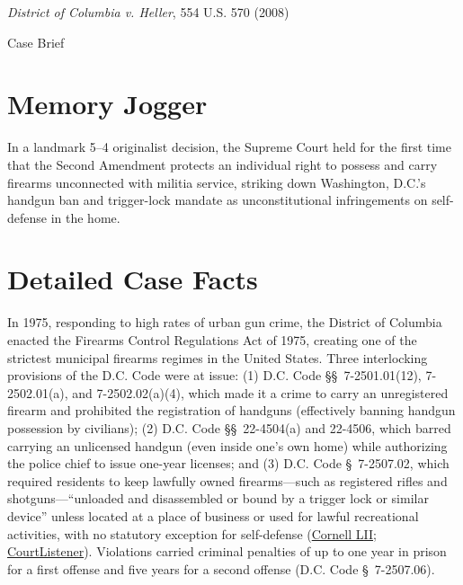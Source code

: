 \documentclass[12pt]{article}
\begin{document}
\begin{center}
{\LARGE \textit{District of Columbia v. Heller}, 554 U.S. 570 (2008)\par}
\vspace{0.8em}
{\large Case Brief\par}
\end{center}
\vspace{1em}

\section{Memory Jogger}
In a landmark 5--4 originalist decision, the Supreme Court held for the first time that the Second Amendment protects an individual right to possess and carry firearms unconnected with militia service, striking down Washington, D.C.'s handgun ban and trigger-lock mandate as unconstitutional infringements on self-defense in the home.

\section{Detailed Case Facts}
In 1975, responding to high rates of urban gun crime, the District of Columbia enacted the Firearms Control Regulations Act of 1975, creating one of the strictest municipal firearms regimes in the United States. Three interlocking provisions of the D.C. Code were at issue: (1) D.C. Code \S\S\ 7-2501.01(12), 7-2502.01(a), and 7-2502.02(a)(4), which made it a crime to carry an unregistered firearm and prohibited the registration of handguns (effectively banning handgun possession by civilians); (2) D.C. Code \S\S\ 22-4504(a) and 22-4506, which barred carrying an unlicensed handgun (even inside one's own home) while authorizing the police chief to issue one-year licenses; and (3) D.C. Code \S\ 7-2507.02, which required residents to keep lawfully owned firearms---such as registered rifles and shotguns---``unloaded and disassembled or bound by a trigger lock or similar device'' unless located at a place of business or used for lawful recreational activities, with no statutory exception for self-defense (\href{https://www.law.cornell.edu/supct/html/07-290.ZO.html}{Cornell LII}; \href{https://www.courtlistener.com/opinion/145777/district-of-columbia-v-heller/}{CourtListener}). Violations carried criminal penalties of up to one year in prison for a first offense and five years for a second offense (D.C. Code \S\ 7-2507.06).
\end{document}
